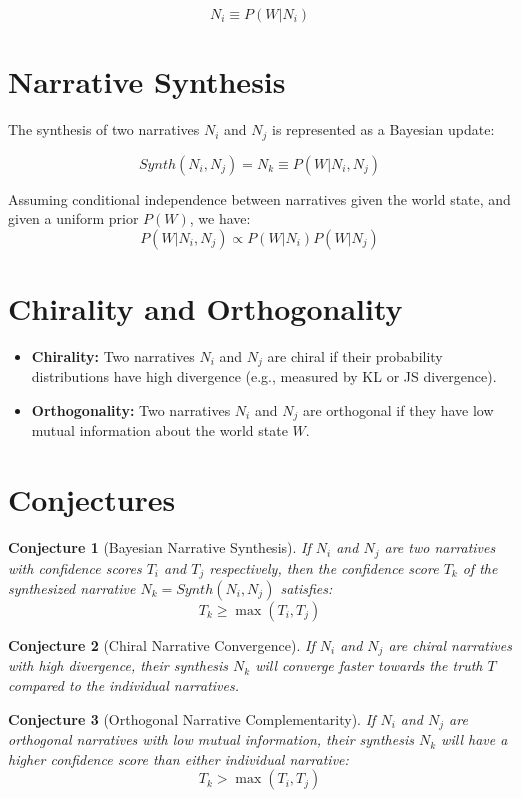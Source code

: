 \documentclass[12pt, a4paper]{article}
\newtheorem{conjecture}{Conjecture}
\begin{document}
\[
N_i \equiv P(W|N_i)
\]

\section{Narrative Synthesis}

The synthesis of two narratives $N_i$ and $N_j$ is represented as a Bayesian update:

\[
Synth(N_i, N_j) = N_k \equiv P(W|N_i, N_j)
\]

Assuming conditional independence between narratives given the world state, and given a uniform prior $P(W)$, we have:
\[P(W|N_i, N_j) \propto P(W|N_i) P(W|N_j) \]


\section{Chirality and Orthogonality}

\begin{itemize}
    \item \textbf{Chirality:}  Two narratives $N_i$ and $N_j$ are chiral if their probability distributions have high divergence (e.g., measured by KL or JS divergence).
    \item \textbf{Orthogonality:} Two narratives $N_i$ and $N_j$ are orthogonal if they have low mutual information about the world state $W$.
\end{itemize}

\section{Conjectures}

\begin{conjecture}[Bayesian Narrative Synthesis]
If $N_i$ and $N_j$ are two narratives with confidence scores $T_i$ and $T_j$ respectively, then the confidence score $T_k$ of the synthesized narrative $N_k = Synth(N_i, N_j)$ satisfies:
\[
T_k \ge \max(T_i, T_j)
\]
\end{conjecture}

\begin{conjecture}[Chiral Narrative Convergence]
If $N_i$ and $N_j$ are chiral narratives with high divergence, their synthesis $N_k$ will converge faster towards the truth $T$ compared to the individual narratives.
\end{conjecture}

\begin{conjecture}[Orthogonal Narrative Complementarity]
If $N_i$ and $N_j$ are orthogonal narratives with low mutual information, their synthesis $N_k$ will have a higher confidence score than either individual narrative:
\[
T_k > \max(T_i, T_j)
\]
\end{conjecture}
\end{document}
